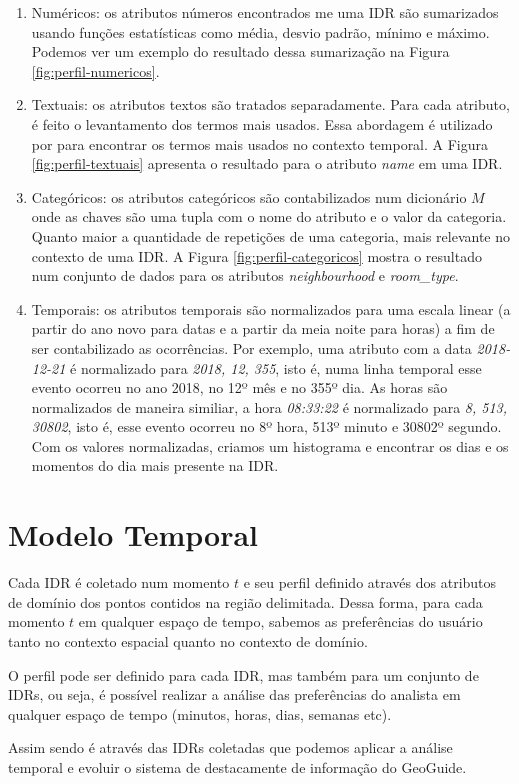 \begin{enumerate}
	\item Numéricos: os atributos números encontrados me uma IDR são sumarizados usando funções estatísticas como média, desvio padrão, mínimo e máximo. Podemos ver um exemplo do resultado dessa sumarização na Figura \ref{fig:perfil-numericos}.

	\item Textuais: os atributos textos são tratados separadamente. Para cada atributo, é feito o levantamento dos termos mais usados. Essa abordagem é utilizado por  para encontrar os termos mais usados no contexto temporal. A Figura \ref{fig:perfil-textuais} apresenta o resultado para o atributo {\em name} em uma IDR.

	\item Categóricos: os atributos categóricos são contabilizados num dicionário $M$ onde as chaves são uma tupla com o nome do atributo e o valor da categoria. Quanto maior a quantidade de repetições de uma categoria, mais relevante no contexto de uma IDR. A Figura \ref{fig:perfil-categoricos} mostra o resultado num conjunto de dados para os atributos {\em neighbourhood} e {\em room\_type}.

	\item Temporais: os atributos temporais são normalizados para uma escala linear (a partir do ano novo para datas e a partir da meia noite para horas) a fim de ser contabilizado as ocorrências. Por exemplo, uma atributo com a data {\em 2018-12-21} é normalizado para {\em 2018, 12, 355}, isto é, numa linha temporal esse evento ocorreu no ano 2018, no 12º mês e no 355º dia. As horas são normalizados de maneira similiar, a hora {\em 08:33:22} é normalizado para {\em 8, 513, 30802}, isto é, esse evento ocorreu no 8º hora, 513º minuto e 30802º segundo. Com os valores normalizadas, criamos um histograma e encontrar os dias e os momentos do dia mais presente na IDR.
\end{enumerate}


\section{Modelo Temporal}

Cada IDR é coletado num momento $t$ e seu perfil definido através dos atributos de domínio dos pontos contidos na região delimitada. Dessa forma, para cada momento $t$ em qualquer espaço de tempo, sabemos as preferências do usuário tanto no contexto espacial quanto no contexto de domínio.

O perfil pode ser definido para cada IDR, mas também para um conjunto de IDRs, ou seja, é possível realizar a análise das preferências do analista em qualquer espaço de tempo (minutos, horas, dias, semanas etc).

Assim sendo é através das IDRs coletadas que podemos aplicar a análise temporal e evoluir o sistema de destacamente de informação do GeoGuide.